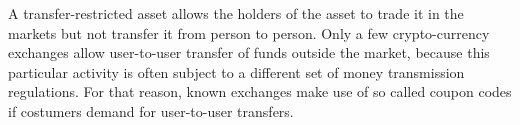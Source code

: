 A transfer-restricted asset allows the holders of the asset to trade it in the
markets but not transfer it from person to person. Only a few crypto-currency
exchanges allow user-to-user transfer of funds outside the market, because this
particular activity is often subject to a different set of money transmission
regulations. For that reason, known exchanges make use of so called coupon
codes if costumers demand for user-to-user transfers.
